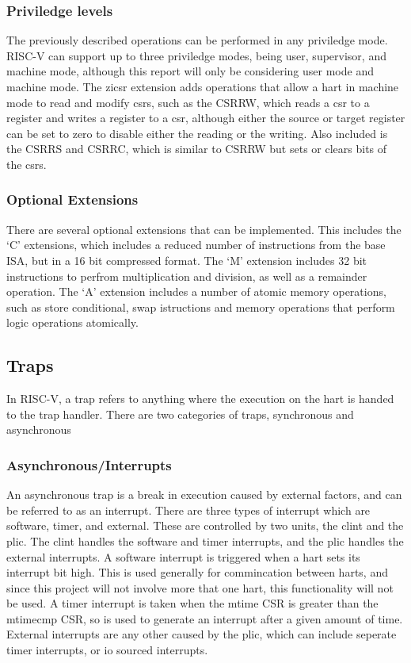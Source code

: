 \subsubsection{Priviledge levels}
The previously described operations can be performed in any priviledge mode. RISC-V can support up to three priviledge modes, being user, supervisor, and machine mode, although this report will only be considering user mode and machine mode. The zicsr extension adds operations that allow a hart in machine mode to read and modify \ac{csrs}, such as the CSRRW, which reads a csr to a register and writes a register to a csr, although either the source or target register can be set to zero to disable either the reading or the writing. Also included is the CSRRS and CSRRC, which is similar to CSRRW but sets or clears bits of the \ac{csrs}. 
\subsubsection{Optional Extensions}
There are several optional extensions that can be implemented. This includes the `C' extensions, which includes a reduced number of instructions from the base ISA, but in a 16 bit compressed format. The `M' extension includes 32 bit instructions to perfrom multiplication and division, as well as a remainder operation. The `A' extension includes a number of atomic memory operations, such as store conditional, swap istructions and memory operations that perform logic operations atomically.
\subsection{Traps}
In RISC-V, a trap refers to anything where the execution on the hart is handed to the trap handler. There are two categories of traps, synchronous and asynchronous
\subsubsection{Asynchronous/Interrupts}
An asynchronous trap is a break in execution caused by external factors, and can be referred to as an interrupt. There are three types of interrupt which are software, timer, and external. These are controlled by two units, the \ac{clint} and the \ac{plic}. The \ac{clint} handles the software and timer interrupts, and the \ac{plic} handles the external interrupts. A software interrupt is triggered when a hart sets its interrupt bit high. This is used generally for commincation between harts, and since this project will not involve more that one hart, this functionality will not be used. A timer interrupt is taken when the mtime CSR is greater than the mtimecmp CSR, so is used to generate an interrupt after a given amount of time. External interrupts are any other caused by the \ac{plic}, which can include seperate timer interrupts, or \ac{io} sourced interrupts.
